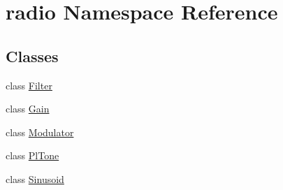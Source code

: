\hypertarget{namespaceradio}{\section{radio Namespace Reference}
\label{namespaceradio}
}
\subsection*{Classes}
\begin{DoxyCompactItemize}
\item 
class \hyperlink{classradio_1_1Filter}{Filter}
\item 
class \hyperlink{classradio_1_1Gain}{Gain}
\item 
class \hyperlink{classradio_1_1Modulator}{Modulator}
\item 
class \hyperlink{classradio_1_1PlTone}{Pl\+Tone}
\item 
class \hyperlink{classradio_1_1Sinusoid}{Sinusoid}
\end{DoxyCompactItemize}
